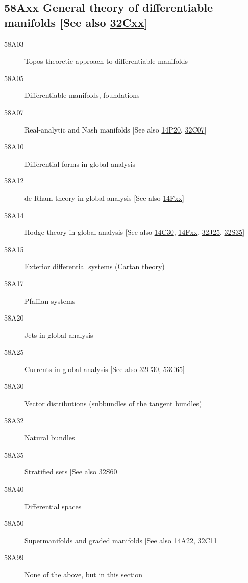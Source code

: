 \subsection*{58Axx  General theory of differentiable manifolds [See also \hyperref[32Cxx]{32Cxx}] }\label{58Axx}
\begin{description}  
\item [58A03]\label{58A03} Topos-theoretic approach to differentiable manifolds
\item [58A05]\label{58A05} Differentiable manifolds, foundations
\item [58A07]\label{58A07} Real-analytic and Nash manifolds [See also \hyperref[14P20]{14P20}, \hyperref[32C07]{32C07}]
\item [58A10]\label{58A10} Differential forms in global analysis
\item [58A12]\label{58A12} de Rham theory in global analysis [See also \hyperref[14Fxx]{14Fxx}]
\item [58A14]\label{58A14} Hodge theory in global analysis [See also \hyperref[14C30]{14C30}, \hyperref[14Fxx]{14Fxx}, \hyperref[32J25]{32J25}, \hyperref[32S35]{32S35}]
\item [58A15]\label{58A15} Exterior differential systems (Cartan theory)
\item [58A17]\label{58A17} Pfaffian systems
\item [58A20]\label{58A20} Jets in global analysis
\item [58A25]\label{58A25} Currents in global analysis [See also \hyperref[32C30]{32C30}, \hyperref[53C65]{53C65}]
\item [58A30]\label{58A30} Vector distributions (subbundles of the tangent bundles)
\item [58A32]\label{58A32} Natural bundles
\item [58A35]\label{58A35} Stratified sets [See also \hyperref[32S60]{32S60}]
\item [58A40]\label{58A40} Differential spaces
\item [58A50]\label{58A50} Supermanifolds and graded manifolds [See also \hyperref[14A22]{14A22}, \hyperref[32C11]{32C11}]
\item [58A99]\label{58A99} None of the above, but in this section
\end{description}
